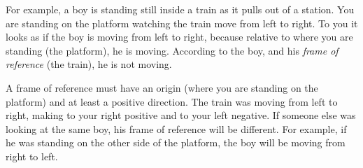 For example, a boy is standing still inside a train as it pulls out of a station. You are standing on the platform watching the train move from left to right. To you it looks as if the boy is moving from left to right, because relative to where you are standing (the platform), he is moving. According to the boy, and his \textsl{frame of reference} (the train), he is not moving.\par 
        \label{m38787*id62666}A frame of reference must have an origin (where you are standing on the platform) and at least a positive direction. The train was moving from left to right, making to your right positive and to your left negative. If someone else was looking at the same boy, his frame of reference will be different. For example, if he was standing on the other side of the platform, the boy will be moving from right to left.\par 
    \setcounter{subfigure}{0}
